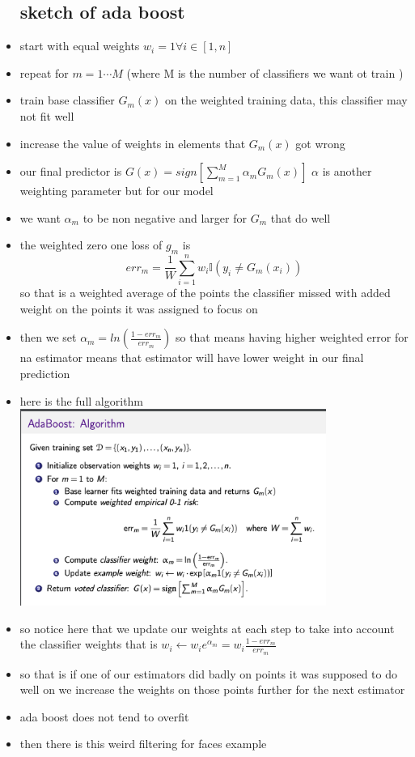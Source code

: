 \documentclass{article}
\begin{document}
\begin{itemize}
\subsection*{sketch of ada boost}
\item start with equal weights $w_{i}=1\forall i\in[1,n]$
\item repeat for $m=1\cdots M$ (where M is the number of classifiers we want ot train )
\item train base classifier $G_{m}(x)$ on the weighted training data, this classifier may not fit well
\item increase the value of weights in elements that $G_{m}(x)$ got wrong 
\item our final predictor is $G(x)=sign[\sum_{m=1}^{M}\alpha_{m}G_{m}(x)]$ $\alpha$ is another weighting parameter but for our model 
\item we want $\alpha_m$ to be non negative and larger for $G_m$ that do well
\item the weighted zero one loss of $g_m$ is $$err_{m}=\frac{1}{W}\sum_{i=1}^{n}w_i\mathbb{I}(y_i\neq G_m(x_i))$$ so that is a weighted average of the points the classifier missed with added weight on the points it was assigned to focus on  
\item then we set $\alpha_m=ln(\frac{1-err_{m}}{err_m})$ so that means having higher weighted error for na estimator means that estimator will have lower weight in our final prediction 
\item here is the full algorithm \\ \includegraphics*[width=10cm]{images/Screenshot 2023-05-14 at 8.50.10 PM.png}
\item so notice here that we update our weights at each step to take into account the classifier weights that is $w_{i}\leftarrow w_{i}e^{\alpha_m}=w_i\frac{1-err_m}{err_m}$
\item so that is if one of our estimators did badly on points it was supposed to do well on we increase the weights on those points further for the next estimator
\item ada boost does not tend to overfit 
\item  then there is this weird filtering for faces example
\end{itemize}
\end{document}
